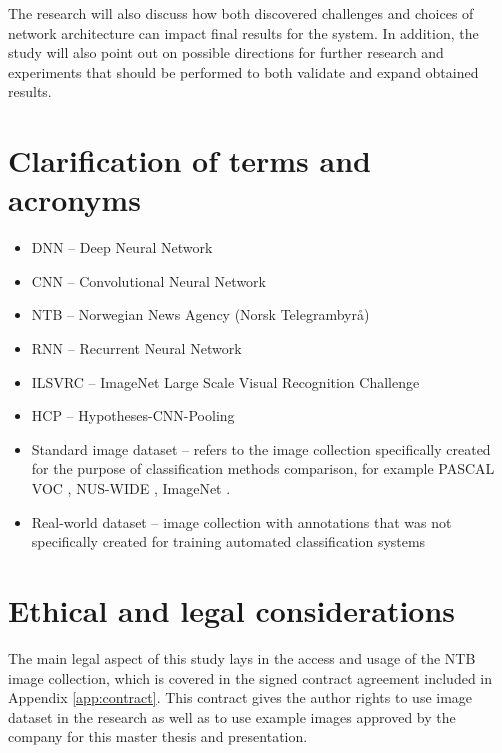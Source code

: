     The research will also discuss how both discovered challenges and choices of network architecture can impact final results for the system. In addition, the study will also point out on possible directions for further research and experiments that should be performed to both validate and expand obtained results.
    

\section{Clarification of terms and acronyms}
    \begin{itemize}
        \item DNN -- Deep Neural Network
        \item CNN -- Convolutional Neural Network
        \item NTB -- Norwegian News Agency (Norsk Telegrambyrå)
        \item RNN -- Recurrent Neural Network
        \item ILSVRC -- ImageNet Large Scale Visual Recognition Challenge
        \item HCP -- Hypotheses-CNN-Pooling
        \item Standard image dataset -- refers to the image collection specifically created for the purpose of classification methods comparison, for example PASCAL VOC \cite{Everingham2010PASCAL-VOC}, NUS-WIDE \cite{Chua2009NUS-WIDE}, ImageNet \cite{Russakovsky2015ImageNet}.
        \item Real-world dataset -- image collection with annotations that was not specifically created for training automated classification systems
    \end{itemize}

\section{Ethical and legal considerations}
    The main legal aspect of this study lays in the access and usage of the NTB image collection, which is covered in the signed contract agreement included in Appendix \ref{app:contract}. This contract gives the author rights to use image dataset in the research as well as to use example images approved by the company for this master thesis and presentation.